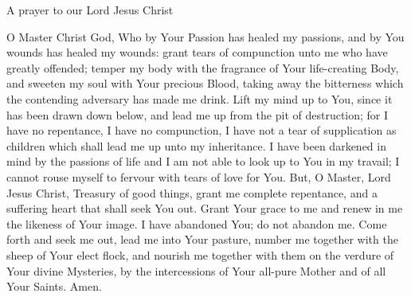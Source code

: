 A prayer to our Lord Jesus Christ

O Master Christ God, Who by Your Passion has healed my passions, and by
You wounds has healed my wounds: grant tears of compunction unto me who
have greatly offended; temper my body with the fragrance of Your
life-creating Body, and sweeten my soul with Your precious Blood, taking
away the bitterness which the contending adversary has made me drink.
Lift my mind up to You, since it has been drawn down below, and lead me
up from the pit of destruction; for I have no repentance, I have no
compunction, I have not a tear of supplication as children which shall
lead me up unto my inheritance. I have been darkened in mind by the
passions of life and I am not able to look up to You in my travail; I
cannot rouse myself to fervour with tears of love for You. But, O
Master, Lord Jesus Christ, Treasury of good things, grant me complete
repentance, and a suffering heart that shall seek You out. Grant Your
grace to me and renew in me the likeness of Your image. I have abandoned
You; do not abandon me. Come forth and seek me out, lead me into Your
pasture, number me together with the sheep of Your elect flock, and
nourish me together with them on the verdure of Your divine Mysteries,
by the intercessions of Your all-pure Mother and of all Your Saints.
Amen.
